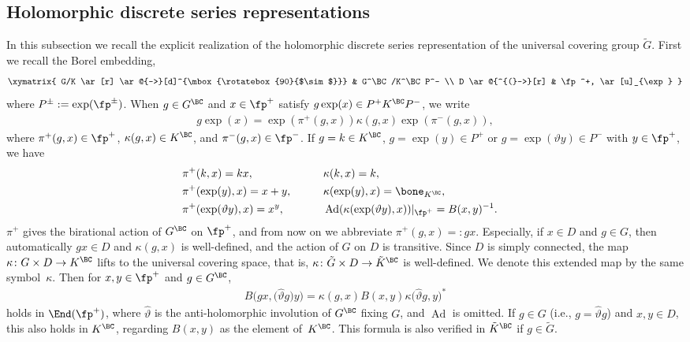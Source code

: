 \subsection{Holomorphic discrete series representations}\label{HDS}
In this subsection we recall the explicit realization of the holomorphic discrete series representation
of the universal covering group $\tilde{G}$. First we recall the Borel embedding,
\begin{gather*} \xymatrix{ G/K \ar[r] \ar@{-->}[d]^{\mbox{\rotatebox{90}{$\sim$}}} & G^\BC/K^\BC P^- \\
 D \ar@{^{(}->}[r] & \fp^+, \ar[u]_{\exp} } \end{gather*}
where $P^\pm:=\exp(\fp^\pm)$. When $g\in G^\BC$ and $x\in \fp^+$ satisfy $g\exp(x)\in P^+K^\BC P^-$, we write
\begin{gather}\label{cocycle}
g\exp(x)=\exp(\pi^+(g,x))\kappa(g,x)\exp(\pi^-(g,x)),
\end{gather}
where $\pi^+(g,x)\in\fp^+$, $\kappa(g,x)\in K^\BC$, and $\pi^-(g,x)\in\fp^-$.
If $g=k\in K^\BC$, $g=\exp(y)\in P^+$ or $g=\exp(\vartheta y)\in P^-$ with $y\in\fp^+$, we have
\begin{alignat*}{3}
&\pi^+(k,x)=kx,\qquad && \kappa(k,x)=k,&\\
& \pi^+(\exp(y),x)=x+y,\qquad && \kappa(\exp(y),x) =\bone_{K^\BC},& \\
& \pi^+(\exp(\vartheta y),x) =x^y,\qquad && \operatorname{Ad}(\kappa(\exp(\vartheta y),x))|_{\fp^+}=B(x,y)^{-1}.&
\end{alignat*}
$\pi^+$ gives the birational action of $G^\BC$ on $\fp^+$, and from now on we abbreviate $\pi^+(g,x)=:gx$.
Especially, if $x\in D$ and $g\in G$, then automatically $gx\in D$ and $\kappa(g,x)$ is well-defined,
and the action of $G$ on $D$ is transitive. Since $D$ is simply connected, the map $\kappa\colon G\times D\to K^\BC$
lifts to the universal covering space, that is, $\kappa\colon \tilde{G}\times D\to \tilde{K}^\BC$ is well-defined.
We denote this extended map by the same symbol~$\kappa$. Then for $x,y\in\fp^+$ and $g\in G^\BC$,
\begin{gather}\label{Bergman_property}
B\big(gx,\big(\hat{\vartheta}g\big)y\big)=\kappa(g,x)B(x,y)\kappa\big(\hat{\vartheta}g,y\big)^*
\end{gather}
holds in $\End(\fp^+)$, where $\hat{\vartheta}$ is the anti-holomorphic involution of $G^\BC$ fixing $G$, and $\operatorname{Ad}$ is omitted.
If $g\in G$ (i.e., $g=\hat{\vartheta}g$) and $x,y\in D$, this also holds in $K^\BC$, regarding $B(x,y)$ as the element of~$K^\BC$.
This formula is also verified in $\tilde{K}^\BC$ if $g\in \tilde{G}$.

